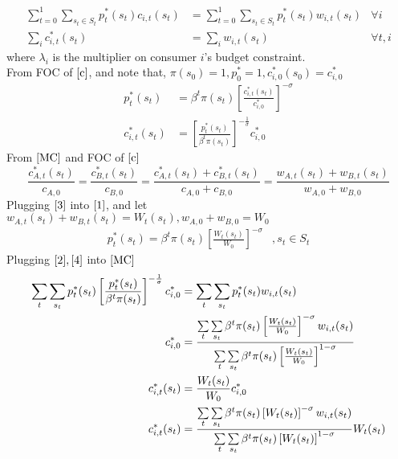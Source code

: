 \documentclass{article}
\begin{document}
\begin{enumerate}
\begin{enumerate}
\begin{align}
                \sum_{t=0}^1\sum\limits_{s_t\in S_t}p_t^\ast(s_t)c_{i,t}(s_t)&=\sum_{t=0}^1\sum\limits_{s_t\in S_t}p_t^\ast(s_t)w_{i,t}(s_t)&\forall i\tag{B.C.}\label{BC}\\
                \sum_i c_{i,t}^\ast(s_t)&=\sum_i w_{i,t}(s_t)&\forall t,i\tag{M.C.}\label{MC}
            \end{align}
            where \(\lambda_i\) is the multiplier on consumer \(i\)'s budget constraint.\\
            From FOC of \(\eqref{c}\), and note that, \(\pi(s_0)=1,p_0^\ast=1,c_{i,0}^\ast(s_0)=c_{i,0}^\ast\)
            \begin{align}
                p_t^\ast(s_t)&=\beta^t\pi(s_t)\left[\frac{c_{i,t}^\ast(s_t)}{c_{i,0}^\ast}\right]^{-\sigma}\label{1}\\
                c_{i,t}^\ast(s_t)&=\left[\frac{p_t^\ast(s_t)}{\beta^t\pi(s_t)}\right]^{-\frac{1}{\sigma}}c_{i,0}^\ast\label{2}
            \end{align}
            From \(\eqref{MC}\) and FOC of \(\eqref{c}\)
            \begin{equation}
                \frac{c_{A,t}^\ast(s_t)}{c_{A,0}}=\frac{c_{B,t}^\ast(s_t)}{c_{B,0}}=\frac{c_{A,t}^\ast(s_t)+c_{B,t}^\ast(s_t)}{c_{A,0}+c_{B,0}}=\frac{w_{A,t}(s_t)+w_{B,t}(s_t)}{w_{A,0}+w_{B,0}}\label{3}
            \end{equation}
            Plugging \(\eqref{3}\) into \(\eqref{1}\), and let \(w_{A,t}(s_t)+w_{B,t}(s_t)=W_t(s_t),w_{A,0}+w_{B,0}=W_0\)
            \begin{align}
                p_t^\ast(s_t)=\beta^t\pi(s_t)\left[\frac{W_t(s_t)}{W_0}\right]^{-\sigma}&,s_t\in S_t\label{4}
            \end{align}
            Plugging \(\eqref{2},\eqref{4}\) into \(\eqref{MC}\)
            \begin{align}
                \sum_{t}\sum_{s_t}p_t^\ast(s_t)\left[\frac{p_t^\ast(s_t)}{\beta^t\pi(s_t)}\right]^{-\frac{1}{\sigma}}c_{i,0}^\ast&=\sum_{t}\sum_{s_t}p_t^\ast(s_t)w_{i,t}(s_t)\notag\\
                c_{i,0}^\ast&=\frac{\sum\limits_{t}\sum\limits_{s_t}\beta^t\pi(s_t)\left[\frac{W_t(s_t)}{W_0}\right]^{-\sigma}w_{i,t}(s_t)}{\sum\limits_{t}\sum\limits_{s_t}\beta^t\pi(s_t)\left[\frac{W_t(s_t)}{W_0}\right]^{1-\sigma}}\notag\\
                c_{i,t}^\ast(s_t)&=\frac{W_t(s_t)}{W_0}c_{i,0}^\ast\notag\\
                c_{i,t}^\ast(s_t)&=\frac{\sum\limits_{t}\sum\limits_{s_t}\beta^t\pi(s_t)\left[W_t(s_t)\right]^{-\sigma}w_{i,t}(s_t)}{\sum\limits_{t}\sum\limits_{s_t}\beta^t\pi(s_t)\left[W_t(s_t)\right]^{1-\sigma}}W_t(s_t)\label{5}

\end{align}
\end{enumerate}
\end{enumerate}
\end{document}
